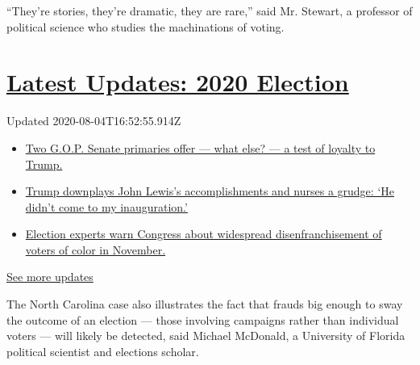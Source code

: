 ``They're stories, they're dramatic, they are rare,'' said Mr. Stewart,
a professor of political science who studies the machinations of voting.

\hypertarget{latest-updates-2020-election}{%
\section{\texorpdfstring{\href{https://www.nytimes.com/2020/08/04/us/elections/primary-election-michigan-arizona-kansas.html?action=click\&pgtype=Article\&state=default\&region=MAIN_CONTENT_1\&context=storylines_live_updates}{Latest
Updates: 2020
Election}}{Latest Updates: 2020 Election}}\label{latest-updates-2020-election}}

Updated 2020-08-04T16:52:55.914Z

\begin{itemize}
\tightlist
\item
  \href{https://www.nytimes.com/2020/08/04/us/elections/primary-election-michigan-arizona-kansas.html?action=click\&pgtype=Article\&state=default\&region=MAIN_CONTENT_1\&context=storylines_live_updates\#link-3924dd44}{Two
  G.O.P. Senate primaries offer --- what else? --- a test of loyalty to
  Trump.}
\item
  \href{https://www.nytimes.com/2020/08/04/us/elections/primary-election-michigan-arizona-kansas.html?action=click\&pgtype=Article\&state=default\&region=MAIN_CONTENT_1\&context=storylines_live_updates\#link-24333e8c}{Trump
  downplays John Lewis's accomplishments and nurses a grudge: `He didn't
  come to my inauguration.'}
\item
  \href{https://www.nytimes.com/2020/08/04/us/elections/primary-election-michigan-arizona-kansas.html?action=click\&pgtype=Article\&state=default\&region=MAIN_CONTENT_1\&context=storylines_live_updates\#link-6d019753}{Election
  experts warn Congress about widespread disenfranchisement of voters of
  color in November.}
\end{itemize}

\href{https://www.nytimes.com/2020/08/04/us/elections/primary-election-michigan-arizona-kansas.html?action=click\&pgtype=Article\&state=default\&region=MAIN_CONTENT_1\&context=storylines_live_updates}{See
more updates}

The North Carolina case also illustrates the fact that frauds big enough
to sway the outcome of an election --- those involving campaigns rather
than individual voters --- will likely be detected, said Michael
McDonald, a University of Florida political scientist and elections
scholar.

